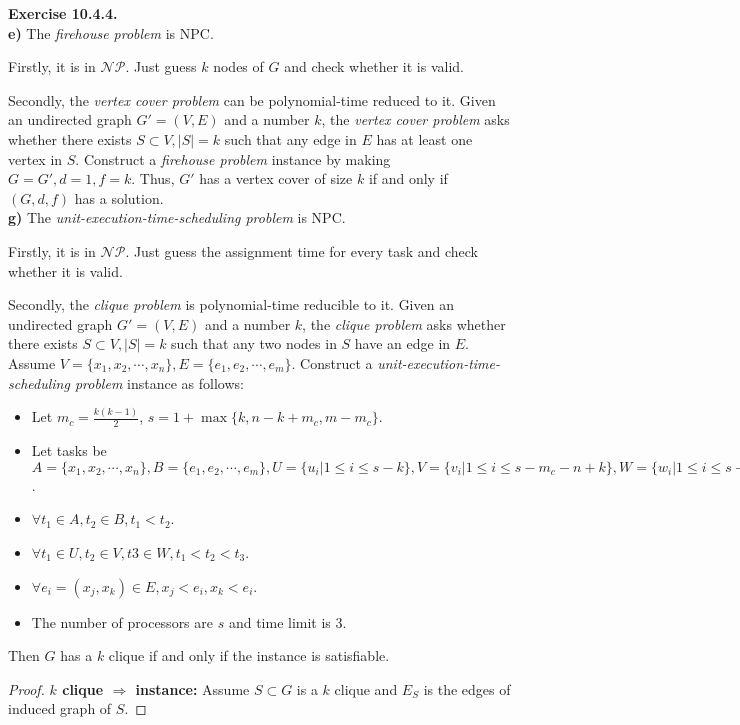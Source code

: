 \documentclass[a4paper]{article}
\newtheorem*{proof}{Proof}
\newenvironment{exercise}[1]{
	\par
	\noindent\textbf{Exercise #1.}\quad
}{
	\par
	\bigskip
}
\begin{document}
\begin{exercise}{10.4.4} \hspace{0pt}\\
\textbf{e)} The \textit{firehouse problem} is NPC.\par
Firstly, it is in $\mathcal{NP}$. Just guess $k$ nodes of $G$ and check whether it is valid.\par
Secondly, the \textit{vertex cover problem} can be polynomial-time reduced to it. Given an undirected graph $G'=(V,E)$ and
a number $k$, the \textit{vertex cover problem} asks whether there exists $S\subset V,|S|=k$ such that any
edge in $E$ has at least one vertex in $S$. Construct a \textit{firehouse problem} instance by making
$G=G',d=1,f=k$. Thus, $G'$ has a vertex cover of size $k$ if and only if $(G,d,f)$ has a solution.\\
\textbf{g)} The \textit{unit-execution-time-scheduling problem} is NPC.\par
Firstly, it is in $\mathcal{NP}$. Just guess the assignment time for every task and check whether it is valid.\par
Secondly, the \textit{clique problem} is polynomial-time reducible to it. Given an undirected graph $G'=(V,E)$ and
a number $k$, the \textit{clique problem} asks whether there exists $S\subset V,|S|=k$ such that any
two nodes in $S$ have an edge in $E$. Assume $V=\{x_1,x_2,\cdots,x_n\},E=\{e_1,e_2,\cdots,e_m\}$.
Construct a \textit{unit-execution-time-scheduling problem} instance as follows:
\begin{itemize}
    \item Let $m_c=\frac{k(k-1)}{2}$, $s=1+\max\{k,n-k+m_c,m-m_c\}$.
    \item Let tasks be $A=\{x_1,x_2,\cdots,x_n\},B=\{e_1,e_2,\cdots,e_m\},U=\{u_i|1\leqslant i\leqslant s-k\},
        V=\{v_i|1\leqslant i\leqslant s-m_c-n+k\},W=\{w_i|1\leqslant i\leqslant s-m+m_c\}$.
    \item $\forall t_1\in A,t_2\in B, t_1<t_2$.
    \item $\forall t_1\in U,t_2\in V,t3\in W, t_1<t_2<t_3$.
    \item $\forall e_i=(x_j,x_k)\in E, x_j<e_i, x_k<e_i$.
    \item The number of processors are $s$ and time limit is $3$.
\end{itemize}
Then $G$ has a $k$ clique if and only if the instance is satisfiable.
\begin{proof}
{\bf$k$ clique $\Rightarrow$ instance:} Assume $S\subset G$ is a $k$ clique and $E_S$ is the edges of induced graph of $S$.

\end{proof}
\end{exercise}
\end{document}
